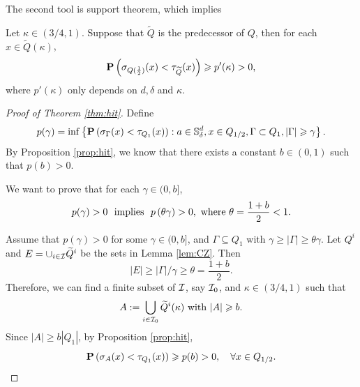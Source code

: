 	The second tool is support theorem, which implies 
	\begin{lemma}\label{lem:hitcube}
		Let $\kappa\in (3/4,1)$. Suppose that $\widetilde{Q}$ is the predecessor of $Q$, then for each $x\in \widetilde{Q}(\kappa)$,  
		\[
		 {\mathbf P}\left( \sigma_{Q(\frac{1}{2})} (x) <\tau_{\widetilde{Q}}(x) \right)\geqslant p'(\kappa)>0,  
		\]
		where $p'(\kappa)$ only depends on $d, \delta$ and $\kappa$. 
	\end{lemma}
	
	\begin{proof}[Proof of Theorem \ref{thm:hit}] 
		Define 
		\begin{align*}
			p(\gamma)=\inf \left\{ {\mathbf P}\left(\sigma_\Gamma(x)<\tau_{Q_{1}}(x)\right): a\in {\mathbb S}^d_\delta, x\in Q_{1/2},  \Gamma\subset Q_1, |\Gamma|\geqslant \gamma \right\}. 
		\end{align*}
		By Proposition \ref{prop:hit}, we know that there exists a constant $b\in (0,1)$ such that $p(b)>0$. 
		\begin{framed}
			We want to prove that for each $\gamma\in (0,b]$, 
			\[
			    p(\gamma)>0 ~\mbox{ implies }~ p\left(\theta\gamma\right)>0, \mbox{ where } \theta=\frac{1+b}{2}<1. 
			\] 
		\end{framed}
		Assume that $p(\gamma)>0$ for some $\gamma\in (0,b]$, and $\Gamma \subseteq Q_1$ with $\gamma\geq |\Gamma|\geq \theta \gamma$. Let $Q^i$ and $E=\cup_{i\in {\mathcal I}} \widetilde{Q}^i$ be the sets in Lemma \ref{lem:CZ}. Then 
		\[
		    |E|\geq {|\Gamma|}/{\gamma} \geq \theta =\frac{1+b}{2}. 
		\]
		Therefore, we can find a finite subset of ${\mathcal I}$, say ${\mathcal I}_0$, and $\kappa\in (3/4,1)$ such that 
		\[
		   A :=\bigcup_{i\in {\mathcal I}_0} \widetilde{Q}^i(\kappa)  \mbox{ with } |A|\geqslant b. 
		\]
		Since $|A|\geq b |Q_1|$, by Proposition \ref{prop:hit}, 
		\begin{equation}\label{eq:hit1}
			{\mathbf P}\left(\sigma_A(x)<\tau_{Q_1}(x)\right)\geqslant p(b)>0, \quad \forall x\in Q_{1/2}. 
		\end{equation}
		

\end{proof}
